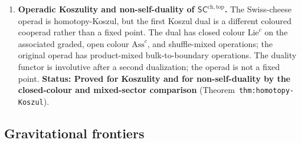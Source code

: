 \documentclass[11pt]{article}
\newcommand{\SCchtop}{\mathsf{SC}^{\mathrm{ch,top}}}
\begin{document}
\begin{enumerate}[label=\textbf{A\arabic*.},leftmargin=2.5em]
\item \textbf{Operadic Koszulity and non-self-duality of $\SCchtop$.}
The Swiss-cheese operad is homotopy-Koszul, but the first Koszul dual
is a different coloured cooperad rather than a fixed point.  The dual
has closed colour $\mathrm{Lie}^{c}$ on the associated graded, open
colour $\mathrm{Ass}^{c}$, and shuffle-mixed operations; the original
operad has product-mixed bulk-to-boundary operations.  The duality
functor is involutive after a second dualization; the operad is not a
fixed point.
\textbf{Status: Proved for Koszulity and for non-self-duality by the
closed-colour and mixed-sector comparison}
(Theorem~\texttt{thm:homotopy-Koszul}).

\end{enumerate}

\subsection{Gravitational frontiers}
\label{ssec:grav-frontiers}
\end{document}
